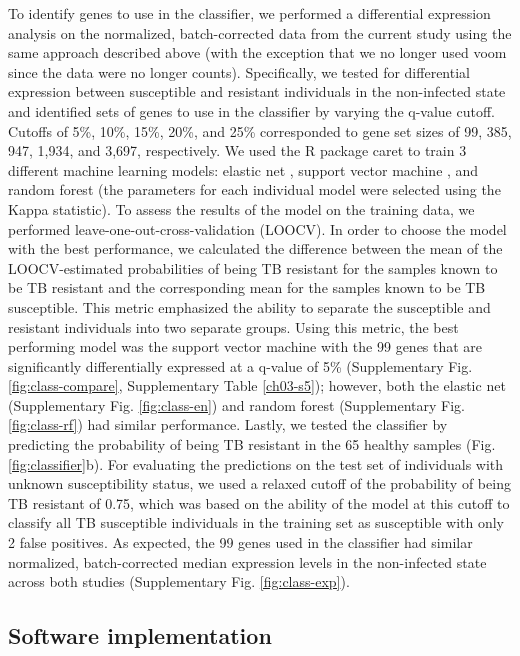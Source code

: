 To identify genes to use in the classifier, we performed a
differential expression analysis on the normalized, batch-corrected
data from the current study using the same approach described above
(with the exception that we no longer used voom \citep{Law2014} since
the data were no longer counts). Specifically, we tested for
differential expression between susceptible and resistant individuals
in the non-infected state and identified sets of genes to use in the
classifier by varying the q-value cutoff. Cutoffs of 5\%, 10\%, 15\%,
20\%, and 25\% corresponded to gene set sizes of 99, 385, 947, 1,934,
and 3,697, respectively. We used the R package caret \citep{Kuhn2008}
to train 3 different machine learning models: elastic net
\citep{Friedman2010}, support vector machine \citep{Karatzoglou2004},
and random forest \citep{Liaw2002} (the parameters for each individual
model were selected using the Kappa statistic). To assess the results
of the model on the training data, we performed
leave-one-out-cross-validation (LOOCV). In order to choose the model
with the best performance, we calculated the difference between the
mean of the LOOCV-estimated probabilities of being TB resistant for
the samples known to be TB resistant and the corresponding mean for
the samples known to be TB susceptible. This metric emphasized the
ability to separate the susceptible and resistant individuals into two
separate groups. Using this metric, the best performing model was the
support vector machine with the 99 genes that are significantly
differentially expressed at a q-value of 5\% (Supplementary Fig.
\ref{fig:class-compare}, Supplementary Table \ref{ch03-s5}); however, both the
elastic net (Supplementary Fig. \ref{fig:class-en}) and random forest
(Supplementary Fig. \ref{fig:class-rf}) had similar performance.
Lastly, we tested the classifier by predicting the probability of
being TB resistant in the 65 healthy samples (Fig.
\ref{fig:classifier}b). For evaluating the predictions on the test set
of individuals with unknown susceptibility status, we used a relaxed
cutoff of the probability of being TB resistant of 0.75, which was
based on the ability of the model at this cutoff to classify all TB
susceptible individuals in the training set as susceptible with only 2
false positives. As expected, the 99 genes used in the classifier had
similar normalized, batch-corrected median expression levels in the
non-infected state across both studies (Supplementary Fig.
\ref{fig:class-exp}).
\subsection{Software implementation}

